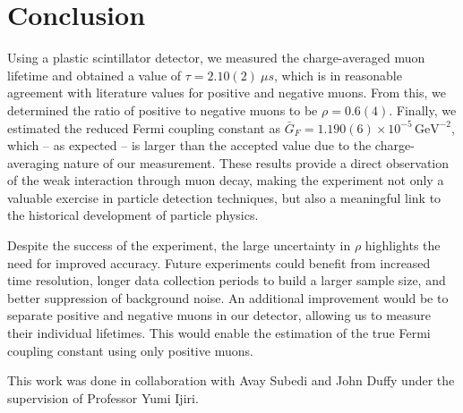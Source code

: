 \documentclass{../paper}
\begin{document}
\section{Conclusion} \label{sec:conclusion}

Using a plastic scintillator detector, we measured the charge-averaged muon lifetime and obtained a value of $\tau = 2.10(2) \ \mu s$, which is in reasonable agreement with literature values for positive and negative muons. From this, we determined the ratio of positive to negative muons to be $\rho = 0.6(4)$. Finally, we estimated the reduced Fermi coupling constant as $\bar G_F = 1.190(6) \times 10^{-5} \, \text{GeV}^{-2}$, which -- as expected -- is larger than the accepted value due to the charge-averaging nature of our measurement. These results provide a direct observation of the weak interaction through muon decay, making the experiment not only a valuable exercise in particle detection techniques, but also a meaningful link to the historical development of particle physics.

Despite the success of the experiment, the large uncertainty in $\rho$ highlights the need for improved accuracy. Future experiments could benefit from increased time resolution, longer data collection periods to build a larger sample size, and better suppression of background noise. An additional improvement would be to separate positive and negative muons in our detector, allowing us to measure their individual lifetimes. This would enable the estimation of the true Fermi coupling constant using only positive muons.

\begin{acknowledgements}
  This work was done in collaboration with Avay Subedi and John Duffy under the supervision of Professor Yumi Ijiri.
\end{acknowledgements}


\end{document}

